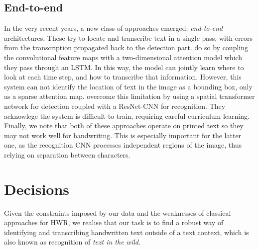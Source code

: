 
	\subsection{End-to-end}\label{sec:related_e2e}
		In the very recent years, a new class of approaches emerged: \emph{end-to-end} architectures. These try to locate and transcribe text in a single pass, with errors from the transcription propagated back to the detection part.  do so by coupling the convolutional feature maps with a two-dimensional attention model which they pass through an LSTM. In this way, the model can jointly learn where to look at each time step, and how to transcribe that information. However, this system can not identify the location of text in the image as a bounding box, only as a sparse attention map.  overcome this limitation by using a spatial transformer network \citep{stn} for detection coupled with a ResNet-CNN for recognition. They acknowlege the system is difficult to train, requiring careful curriculum learning. Finally, we note that both of these approaches operate on printed text so they may not work well for handwriting. This is especially important for the latter one, as the recognition CNN processes independent regions of the image, thus relying on separation between characters.





\section{Decisions}

	Given the constraints imposed by our data and the weaknesses of classical approaches for HWR, we realise that our task is to find a robust way of identifying and transcribing handwritten text outside of a text context, which is also known as recognition of \emph{text in the wild}.





